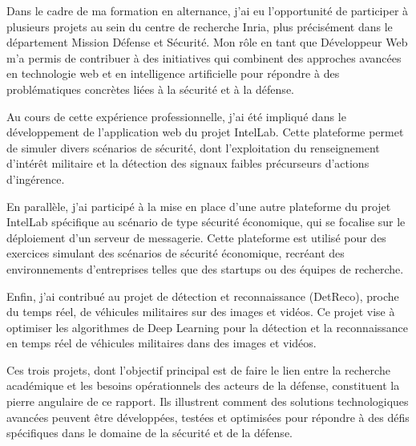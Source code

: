 \sloppy

Dans le cadre de ma formation en alternance, j'ai eu l'opportunité de participer à plusieurs projets au sein du centre de recherche Inria, plus précisément dans le département Mission Défense et Sécurité. Mon rôle en tant que Développeur Web m'a permis de contribuer à des initiatives qui combinent des approches avancées en technologie web et en intelligence artificielle pour répondre à des problématiques concrètes liées à la sécurité et à la défense.

Au cours de cette expérience professionnelle, j'ai été impliqué dans le développement de l'application web du projet IntelLab. Cette plateforme permet de simuler divers scénarios de sécurité, dont l'exploitation du renseignement d'intérêt militaire et la détection des signaux faibles précurseurs d'actions d'ingérence.

En parallèle, j'ai participé à la mise en place d'une autre plateforme du projet IntelLab spécifique au scénario de type sécurité économique, qui se focalise sur le déploiement d'un serveur de messagerie. Cette plateforme est utilisé pour des exercices simulant des scénarios de sécurité économique, recréant des environnements d'entreprises telles que des startups ou des équipes de recherche.

Enfin, j'ai contribué au projet de détection et reconnaissance (DetReco), proche du temps réel, de véhicules militaires sur des images et vidéos. Ce projet vise à optimiser les algorithmes de Deep Learning pour la détection et la reconnaissance en temps réel de véhicules militaires dans des images et vidéos.

Ces trois projets, dont l'objectif principal est de faire le lien entre la recherche académique et les besoins opérationnels des acteurs de la défense, constituent la pierre angulaire de ce rapport. Ils illustrent comment des solutions technologiques avancées peuvent être développées, testées et optimisées pour répondre à des défis spécifiques dans le domaine de la sécurité et de la défense.

